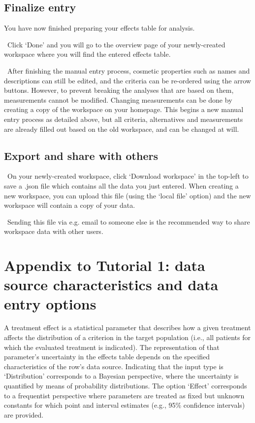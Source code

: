 \documentclass[00_mcda_tutorial.tex]{subfiles}
\begin{document}
\subsection*{Finalize entry}
You have now finished preparing your effects table for analysis.
\newline

\noindent \leftpointright \, Click ‘Done’ and you will go to the overview page of your newly-created workspace where you will find the entered effects table.
\newline

\noindent \faGraduationCap \, After finishing the manual entry process, cosmetic properties such as names and descriptions can still be edited, and the criteria can be re-ordered using the arrow buttons. However, to prevent breaking the analyses that are based on them, measurements cannot be modified. Changing measurements can be done by creating a copy of the workspace on your homepage. This begins a new manual entry process as detailed above, but all criteria, alternatives and measurements are already filled out based on the old workspace, and can be changed at will.

\subsection*{Export and share with others}
\noindent \leftpointright \, On your newly-created workspace, click ‘Download workspace’ in the top-left to save a .json file which contains all the data you just entered. When creating a new workspace, you can upload this file (using the ‘local file’ option) and the new workspace will contain a copy of your data.
\newline

\noindent \faLightbulbO \, Sending this file via e.g. email to someone else is the recommended way to share workspace data with other users.
\clearpage





\section*{Appendix to Tutorial 1: data source characteristics and data entry options}
\label{appendix1}

A treatment effect is a statistical parameter that describes how a given treatment affects the distribution of a criterion in the target population (i.e., all patients for which the evaluated treatment is indicated). The representation of that parameter’s uncertainty in the effects table depends on the specified characteristics of the row’s data source. Indicating that the input type is ‘Distribution’ corresponds to a Bayesian perspective, where the uncertainty is quantified by means of probability distributions. The option ‘Effect’ corresponds to a frequentist perspective where parameters are treated as fixed but unknown constants for which point and interval estimates (e.g., 95\% confidence intervals) are provided.
\end{document}
